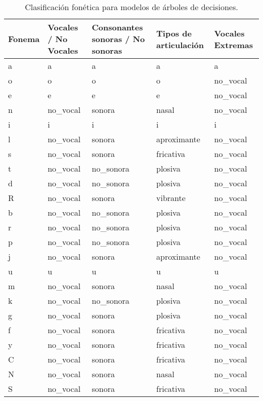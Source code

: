 \begin{table}[H]
\centering
\caption{Clasificaci\'on fonética para modelos de \'arboles de decisiones.}
\label{tab:transformacion_fonetica_arboles}
\begin{tabular}{|l|l|l|l|l|}
\hline
\textbf{Fonema} & \multicolumn{1}{|p{2.5cm}|}{\textbf{Vocales / No Vocales}} &  \multicolumn{1}{|p{3cm}|}{\textbf{Consonantes sonoras / No sonoras}} &  \multicolumn{1}{|p{2.5cm}|}{\textbf{Tipos de articulación}} & \multicolumn{1}{|p{2.3cm}|}{\textbf{Vocales Extremas}} \\\hline
a   & a         & a          & a           & a         \\ \hline
o   & o         & o          & o           & no\_vocal \\ \hline
e   & e         & e          & e           & no\_vocal \\ \hline
n   & no\_vocal & sonora     & nasal       & no\_vocal \\ \hline
i   & i         & i          & i           & i         \\ \hline
l   & no\_vocal & sonora     & aproximante & no\_vocal \\ \hline
s   & no\_vocal & sonora     & fricativa   & no\_vocal \\ \hline
t   & no\_vocal & no\_sonora & plosiva     & no\_vocal \\ \hline
d   & no\_vocal & no\_sonora & plosiva     & no\_vocal \\ \hline
R   & no\_vocal & sonora     & vibrante    & no\_vocal \\ \hline
b   & no\_vocal & no\_sonora & plosiva     & no\_vocal \\ \hline
r   & no\_vocal & no\_sonora & plosiva     & no\_vocal \\ \hline
p   & no\_vocal & no\_sonora & plosiva     & no\_vocal \\ \hline
j   & no\_vocal & sonora     & aproximante & no\_vocal \\ \hline
u   & u         & u          & u           & u         \\ \hline
m   & no\_vocal & sonora     & nasal       & no\_vocal \\ \hline
k   & no\_vocal & no\_sonora & plosiva     & no\_vocal \\ \hline
g   & no\_vocal & sonora     & plosiva     & no\_vocal \\ \hline
f   & no\_vocal & sonora     & fricativa   & no\_vocal \\ \hline
y   & no\_vocal & sonora     & fricativa   & no\_vocal \\ \hline
C   & no\_vocal & sonora     & fricativa   & no\_vocal \\ \hline
N   & no\_vocal & sonora     & nasal       & no\_vocal \\ \hline
S   & no\_vocal & sonora     & fricativa   & no\_vocal \\ \hline
\end{tabular}
\end{table}
